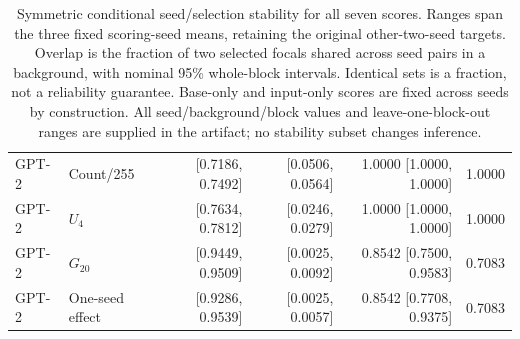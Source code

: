 \begin{table}[tp]
\begin{tabular}{llrrrr}
GPT-2 & Count/255 & [0.7186, 0.7492] & [0.0506, 0.0564] & 1.0000 [1.0000, 1.0000] & 1.0000 \\
GPT-2 & $U_4$ & [0.7634, 0.7812] & [0.0246, 0.0279] & 1.0000 [1.0000, 1.0000] & 1.0000 \\
GPT-2 & $G_{20}$ & [0.9449, 0.9509] & [0.0025, 0.0092] & 0.8542 [0.7500, 0.9583] & 0.7083 \\
GPT-2 & One-seed effect & [0.9286, 0.9539] & [0.0025, 0.0057] & 0.8542 [0.7708, 0.9375] & 0.7083 \\
\bottomrule
\end{tabular}
\caption{Symmetric conditional seed/selection stability for all seven scores. Ranges span the three fixed scoring-seed means, retaining the original other-two-seed targets. Overlap is the fraction of two selected focals shared across seed pairs in a background, with nominal 95\% whole-block intervals. Identical sets is a fraction, not a reliability guarantee. Base-only and input-only scores are fixed across seeds by construction. All seed/background/block values and leave-one-block-out ranges are supplied in the artifact; no stability subset changes inference.}
\label{tab:review_stability}
\end{table}

